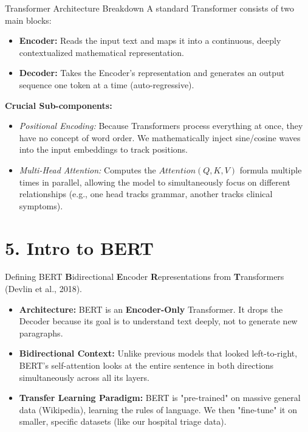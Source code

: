 \documentclass[aspectratio=169]{beamer}
\begin{document}
	\begin{frame}{Transformer Architecture Breakdown}
		A standard Transformer consists of two main blocks:
		\begin{itemize}
			\item \textbf{Encoder:} Reads the input text and maps it into a continuous, deeply contextualized mathematical representation.
			\item \textbf{Decoder:} Takes the Encoder's representation and generates an output sequence one token at a time (auto-regressive).
		\end{itemize}
		\vspace{0.2cm}
		\textbf{Crucial Sub-components:}
		\begin{itemize}
			\item \textit{Positional Encoding:} Because Transformers process everything at once, they have no concept of word order. We mathematically inject sine/cosine waves into the input embeddings to track positions.
			\item \textit{Multi-Head Attention:} Computes the $Attention(Q,K,V)$ formula multiple times in parallel, allowing the model to simultaneously focus on different relationships (e.g., one head tracks grammar, another tracks clinical symptoms).
		\end{itemize}
	\end{frame}
	
	\section{5. Intro to BERT}
	
	\begin{frame}{Defining BERT}
		\textbf{B}idirectional \textbf{E}ncoder \textbf{R}epresentations from \textbf{T}ransformers (Devlin et al., 2018).
		
		\vspace{0.3cm}
		\begin{itemize}
			\item \textbf{Architecture:} BERT is an \textbf{Encoder-Only} Transformer. It drops the Decoder because its goal is to understand text deeply, not to generate new paragraphs.
			\item \textbf{Bidirectional Context:} Unlike previous models that looked left-to-right, BERT's self-attention looks at the entire sentence in both directions simultaneously across all its layers.
			\item \textbf{Transfer Learning Paradigm:} BERT is "pre-trained" on massive general data (Wikipedia), learning the rules of language. We then "fine-tune" it on smaller, specific datasets (like our hospital triage data).
		\end{itemize}
	\end{frame}
	
\end{document}
